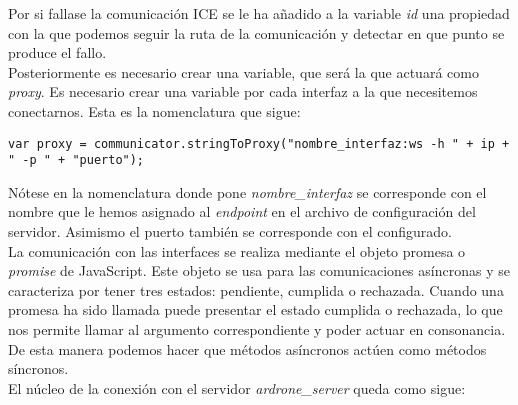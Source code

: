 Por si fallase la comunicación ICE se le ha añadido a la variable \emph{id} una propiedad con la que podemos seguir la ruta de la comunicación y detectar en que punto se produce el fallo.\\

Posteriormente es necesario crear una variable, que será la que actuará como \emph{proxy}. Es necesario crear una variable por cada interfaz a la que necesitemos conectarnos. Esta es la nomenclatura que sigue:\\

\begin{lstlisting}[caption=Nomenclatura de variable que actuará como \emph{proxy}]
var proxy = communicator.stringToProxy("nombre_interfaz:ws -h " + ip + " -p " + "puerto");
\end{lstlisting}

Nótese en la nomenclatura donde pone \emph{nombre\_interfaz} se corresponde con el nombre que le hemos asignado al \emph{endpoint} en el archivo de configuración del servidor. Asimismo el puerto también se corresponde con el configurado.\\


La comunicación con las interfaces se realiza mediante el objeto promesa o \emph{promise} de JavaScript. Este objeto se usa para las comunicaciones asíncronas y se caracteriza por tener tres estados: pendiente, cumplida o rechazada. Cuando una promesa ha sido llamada puede presentar el estado cumplida o rechazada, lo que nos permite llamar al argumento correspondiente y poder actuar en consonancia. De esta manera podemos hacer que métodos asíncronos actúen como métodos síncronos.\\

El núcleo de la conexión con el servidor \emph{ardrone\_server} queda como sigue:\\

